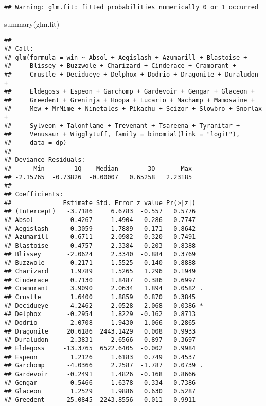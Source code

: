 \documentclass[
]{article}
\newenvironment{Shaded}{\begin{snugshade}}{\end{snugshade}}
\newcommand{\FunctionTok}[1]{\textcolor[rgb]{0.00,0.00,0.00}{#1}}
\newcommand{\NormalTok}[1]{#1}
\begin{document}
\begin{verbatim}
## Warning: glm.fit: fitted probabilities numerically 0 or 1 occurred
\end{verbatim}

\begin{Shaded}
\begin{Highlighting}[]
\FunctionTok{summary}\NormalTok{(glm.fit)}
\end{Highlighting}
\end{Shaded}

\begin{verbatim}
## 
## Call:
## glm(formula = win ~ Absol + Aegislash + Azumarill + Blastoise + 
##     Blissey + Buzzwole + Charizard + Cinderace + Cramorant + 
##     Crustle + Decidueye + Delphox + Dodrio + Dragonite + Duraludon + 
##     Eldegoss + Espeon + Garchomp + Gardevoir + Gengar + Glaceon + 
##     Greedent + Greninja + Hoopa + Lucario + Machamp + Mamoswine + 
##     Mew + MrMime + Ninetales + Pikachu + Scizor + Slowbro + Snorlax + 
##     Sylveon + Talonflame + Trevenant + Tsareena + Tyranitar + 
##     Venusaur + Wigglytuff, family = binomial(link = "logit"), 
##     data = dp)
## 
## Deviance Residuals: 
##      Min        1Q    Median        3Q       Max  
## -2.15765  -0.73826  -0.00007   0.65258   2.23185  
## 
## Coefficients:
##              Estimate Std. Error z value Pr(>|z|)  
## (Intercept)   -3.7186     6.6783  -0.557   0.5776  
## Absol         -0.4267     1.4904  -0.286   0.7747  
## Aegislash     -0.3059     1.7889  -0.171   0.8642  
## Azumarill      0.6711     2.0982   0.320   0.7491  
## Blastoise      0.4757     2.3384   0.203   0.8388  
## Blissey       -2.0624     2.3340  -0.884   0.3769  
## Buzzwole      -0.2171     1.5525  -0.140   0.8888  
## Charizard      1.9789     1.5265   1.296   0.1949  
## Cinderace      0.7130     1.8487   0.386   0.6997  
## Cramorant      3.9090     2.0634   1.894   0.0582 .
## Crustle        1.6400     1.8859   0.870   0.3845  
## Decidueye     -4.2462     2.0528  -2.068   0.0386 *
## Delphox       -0.2954     1.8229  -0.162   0.8713  
## Dodrio        -2.0708     1.9430  -1.066   0.2865  
## Dragonite     20.6186  2443.1429   0.008   0.9933  
## Duraludon      2.3831     2.6566   0.897   0.3697  
## Eldegoss     -13.3765  6522.6405  -0.002   0.9984  
## Espeon         1.2126     1.6183   0.749   0.4537  
## Garchomp      -4.0366     2.2587  -1.787   0.0739 .
## Gardevoir     -0.2491     1.4826  -0.168   0.8666  
## Gengar         0.5466     1.6378   0.334   0.7386  
## Glaceon        1.2529     1.9886   0.630   0.5287  
## Greedent      25.0845  2243.8556   0.011   0.9911  

\end{verbatim}
\end{document}

